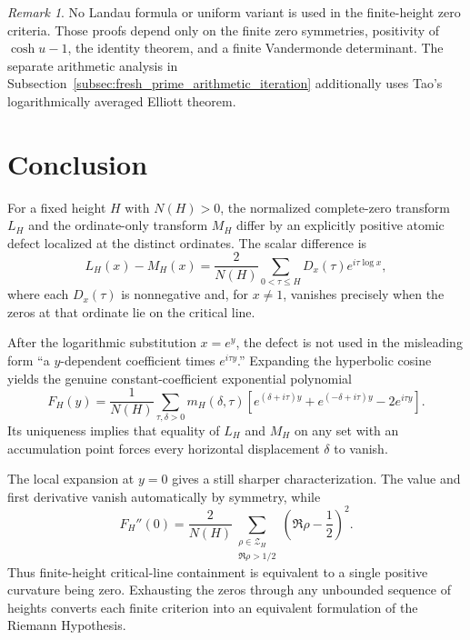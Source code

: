 \documentclass[11pt]{amsart}
\numberwithin{equation}{section}
\theoremstyle{plain}
\theoremstyle{definition}
\theoremstyle{remark}
\newtheorem{remark}[theorem]{Remark}
\begin{document}
\begin{remark}
\label{rem:no_Landau}
No Landau formula or uniform variant is used in the finite-height zero criteria.  Those proofs depend only on the finite zero symmetries, positivity of $\cosh u-1$, the identity theorem, and a finite Vandermonde determinant.  The separate arithmetic analysis in Subsection~\ref{subsec:fresh_prime_arithmetic_iteration} additionally uses Tao's logarithmically averaged Elliott theorem.
\end{remark}

\section{Conclusion}
\label{sec:conclusion}

For a fixed height $H$ with $N(H)>0$, the normalized complete-zero transform $L_H$ and the ordinate-only transform $M_H$ differ by an explicitly positive atomic defect localized at the distinct ordinates.  The scalar difference is
\begin{equation}
L_H(x)-M_H(x)
=
\frac{2}{N(H)}
\sum_{0<\tau\leq H}D_x(\tau)e^{i\tau\log x},
\label{eq:conclusion_defect}
\end{equation}
where each $D_x(\tau)$ is nonnegative and, for $x\neq1$, vanishes precisely when the zeros at that ordinate lie on the critical line.

After the logarithmic substitution $x=e^y$, the defect is not used in the misleading form ``a $y$-dependent coefficient times $e^{i\tau y}$.''  Expanding the hyperbolic cosine yields the genuine constant-coefficient exponential polynomial
\begin{equation}
F_H(y)
=
\frac{1}{N(H)}
\sum_{\tau,\delta>0}
m_H(\delta,\tau)
\left[
 e^{(\delta+i\tau)y}
+e^{(-\delta+i\tau)y}
-2e^{i\tau y}
\right].
\label{eq:conclusion_exponential_polynomial}
\end{equation}
Its uniqueness implies that equality of $L_H$ and $M_H$ on any set with an accumulation point forces every horizontal displacement $\delta$ to vanish.

The local expansion at $y=0$ gives a still sharper characterization.  The value and first derivative vanish automatically by symmetry, while
\begin{equation}
F_H''(0)
=
\frac{2}{N(H)}
\sum_{\substack{\rho\in\mathcal Z_H\\\Re\rho>1/2}}
\left(\Re\rho-\frac12\right)^2.
\label{eq:conclusion_curvature}
\end{equation}
Thus finite-height critical-line containment is equivalent to a single positive curvature being zero.  Exhausting the zeros through any unbounded sequence of heights converts each finite criterion into an equivalent formulation of the Riemann Hypothesis.
\end{document}
